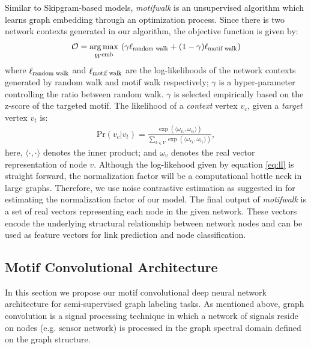 \documentclass{article}
\DeclareMathOperator*{\argmax}{arg\,max}
\theoremstyle{definition}
\begin{document}
Similar to Skipgram-based models, \emph{motifwalk} is an unsupervised
algorithm which learns graph embedding through an optimization process. 
Since there is two network contexts generated in our algorithm, the 
objective function is given by:
\begin{equation} \label{eq:mloss}
\begin{aligned}
&\mathcal{O} = \argmax_{W^{\scalebox{0.75}{emb}}}\ (\gamma 
\ell_{\scalebox{0.75}{random walk}} + (1-\gamma) \ell_{\scalebox{0.75}
{motif walk}}) \\
\end{aligned}
\end{equation}
where $\ell_{\scalebox{0.75}{random walk}}$ and $\ell_{\scalebox{0.75}
{motif walk}}$
are the log-likelihoods of the network contexts generated by
random walk and motif walk respectively; $\gamma$ is a hyper-parameter
controlling the ratio between random walk. $\gamma$ is selected 
empirically based on the z-score of the targeted motif. The likelihood
of a \emph{context} vertex $v_c$, given a \emph{target} vertex $v_t$ is:
\begin{equation} \label{eq:ll}
\begin{aligned}
    \mbox{Pr} (v_c | v_t) = \frac{\exp{( \langle \omega_{v_c} ,  \omega_{v_t} \rangle )}}{\sum_{k \in V} \exp{( \langle \omega_{v_k} ,  \omega_{v_t} \rangle )}},
\end{aligned}
\end{equation}
here, $\langle \cdot , \cdot \rangle$ denotes the inner product; and $\omega_v$ denotes
the real vector representation of node $v$. Although the log-likehood given
by equation \ref{eq:ll} is straight forward, the normalization factor will be
a computational bottle neck in large graphs. Therefore, we use noise contrastive
estimation as suggested in \cite{skipgram,node2vec} for estimating the 
normalization
factor of our model. The final output of \emph{motifwalk} is a set of real 
vectors representing each node in the given network. These vectors encode 
the underlying
structural relationship between network nodes and can be used as feature vectors
for link prediction and node classification.

\subsection{Motif Convolutional Architecture}

In this section we propose our motif convolutional deep
neural network architecture for semi-supervised graph labeling
tasks. As mentioned above, graph convolution is a signal processing technique in which
a network of signals reside on nodes (e.g. sensor network) is
processed in the graph spectral domain defined on the graph structure.
\end{document}
